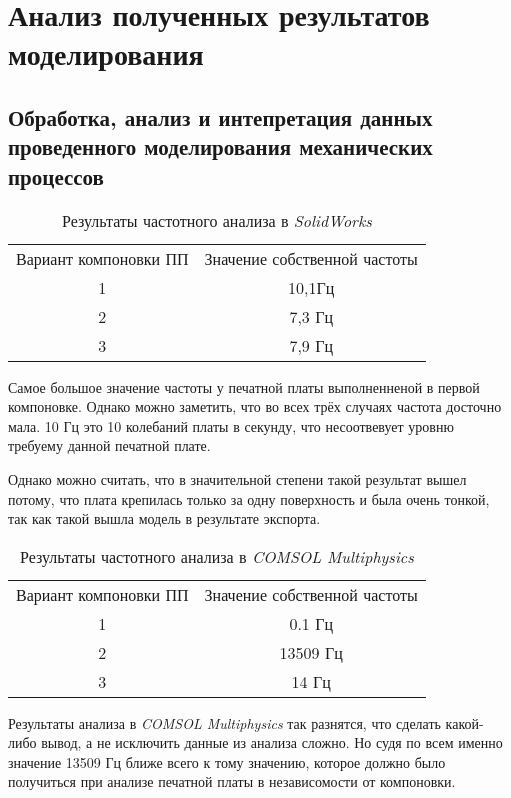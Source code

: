 \newpage
\section{Анализ полученных результатов моделирования}
\subsection{Обработка, анализ и интепретация данных проведенного моделирования механических процессов}

\begin{table}[H]
  \centering
  \caption{Результаты частотного анализа в \textit{SolidWorks}}
\begin{tabular}{|c|c|}
\hline
  Вариант компоновки ПП & Значение собственной частоты \\
  1 & 10,1Гц \\
  2 & 7,3 Гц \\
  3 & 7,9 Гц \\
\hline
\end{tabular}
\end{table}

Самое большое значение частоты у печатной платы выполненненой в первой компоновке. Однако можно заметить, что во всех трёх случаях частота досточно мала. 10 Гц это 10 колебаний платы в секунду, что несоотвевует уровню требуему данной печатной плате.

Однако можно считать, что в значительной степени такой результат вышел потому, что плата крепилась только за одну поверхность и была очень тонкой, так как такой вышла модель в результате экспорта.

\begin{table}[H]
  \centering
  \caption{Результаты частотного анализа в \textit{COMSOL Multiphysics}}
\begin{tabular}{|c|c|}
\hline
  Вариант компоновки ПП & Значение собственной частоты \\
  1 & 0.1 Гц \\
  2 & 13509 Гц \\
  3 & 14 Гц \\
\hline
\end{tabular}
\end{table}

Результаты анализа в \textit{COMSOL Multiphysics} так разнятся, что сделать какой-либо вывод, а не исключить данные из анализа сложно.
Но судя по всем именно значение 13509 Гц ближе всего к тому значению, которое должно было получиться при анализе печатной платы в независомости от компоновки.
